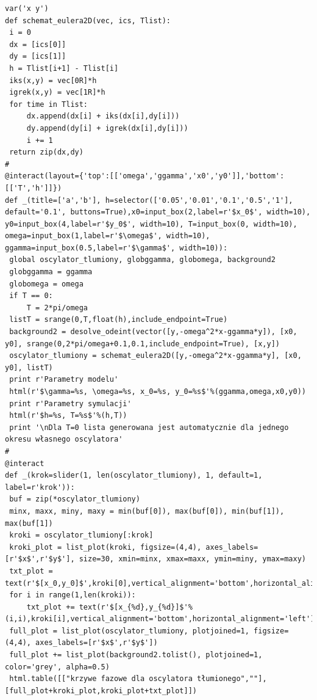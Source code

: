 \documentclass[a4paper,12pt,polish]{sphinxmanual}
\begin{document}
\begin{verbatim}
var('x y')
def schemat_eulera2D(vec, ics, Tlist):
 i = 0
 dx = [ics[0]]
 dy = [ics[1]]
 h = Tlist[i+1] - Tlist[i]
 iks(x,y) = vec[0R]*h
 igrek(x,y) = vec[1R]*h
 for time in Tlist:
     dx.append(dx[i] + iks(dx[i],dy[i]))
     dy.append(dy[i] + igrek(dx[i],dy[i]))
     i += 1
 return zip(dx,dy)
#
@interact(layout={'top':[['omega','ggamma','x0','y0']],'bottom':[['T','h']]})
def _(title=['a','b'], h=selector(['0.05','0.01','0.1','0.5','1'], default='0.1', buttons=True),x0=input_box(2,label=r'$x_0$', width=10), y0=input_box(4,label=r'$y_0$', width=10), T=input_box(0, width=10), omega=input_box(1,label=r'$\omega$', width=10), ggamma=input_box(0.5,label=r'$\gamma$', width=10)):
 global oscylator_tlumiony, globggamma, globomega, background2
 globggamma = ggamma
 globomega = omega
 if T == 0:
     T = 2*pi/omega
 listT = srange(0,T,float(h),include_endpoint=True)
 background2 = desolve_odeint(vector([y,-omega^2*x-ggamma*y]), [x0, y0], srange(0,2*pi/omega+0.1,0.1,include_endpoint=True), [x,y])
 oscylator_tlumiony = schemat_eulera2D([y,-omega^2*x-ggamma*y], [x0, y0], listT)
 print r'Parametry modelu'
 html(r'$\gamma=%s, \omega=%s, x_0=%s, y_0=%s$'%(ggamma,omega,x0,y0))
 print r'Parametry symulacji'
 html(r'$h=%s, T=%s$'%(h,T))
 print '\nDla T=0 lista generowana jest automatycznie dla jednego okresu własnego oscylatora'
#
@interact
def _(krok=slider(1, len(oscylator_tlumiony), 1, default=1, label=r'krok')):
 buf = zip(*oscylator_tlumiony)
 minx, maxx, miny, maxy = min(buf[0]), max(buf[0]), min(buf[1]), max(buf[1])
 kroki = oscylator_tlumiony[:krok]
 kroki_plot = list_plot(kroki, figsize=(4,4), axes_labels=[r'$x$',r'$y$'], size=30, xmin=minx, xmax=maxx, ymin=miny, ymax=maxy)
 txt_plot = text(r'$[x_0,y_0]$',kroki[0],vertical_alignment='bottom',horizontal_alignment='left')
 for i in range(1,len(kroki)):
     txt_plot += text(r'$[x_{%d},y_{%d}]$'%(i,i),kroki[i],vertical_alignment='bottom',horizontal_alignment='left')
 full_plot = list_plot(oscylator_tlumiony, plotjoined=1, figsize=(4,4), axes_labels=[r'$x$',r'$y$'])
 full_plot += list_plot(background2.tolist(), plotjoined=1, color='grey', alpha=0.5)
 html.table([["krzywe fazowe dla oscylatora tłumionego",""],[full_plot+kroki_plot,kroki_plot+txt_plot]])
\end{verbatim}
\end{document}
